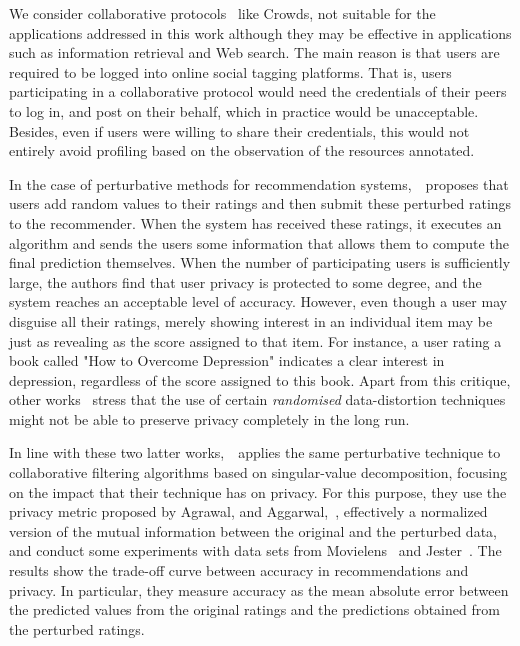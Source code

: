 We consider collaborative protocols~\cite{Domingo09DKE,Rebollo09COMCOM,Domingo12INS} like Crowds, not suitable for the applications addressed in this work although they may be effective in applications such as information retrieval and Web search. The main reason is that users are required to be logged into online social tagging platforms. That is, users participating in a collaborative protocol would need the credentials of their peers to log in, and post on their behalf, which in practice would be unacceptable. Besides, even if users were willing to share their credentials, this would not entirely avoid profiling based on the observation of the resources annotated.

In the case of perturbative methods for recommendation systems,~\cite{Polat03SDM}~proposes that users add random values to their ratings and then submit these perturbed ratings to the recommender. When the system has received these ratings, it executes an algorithm and sends the users some information that allows them to compute the final prediction themselves. When the number of participating users is sufficiently large, the authors find that user privacy is protected to some degree, and the system reaches an acceptable level of accuracy. However, even though a user may disguise all their ratings, merely showing interest in an individual item may be just as revealing as the score assigned to that item. For instance, a user rating a book called "How to Overcome Depression" indicates a clear interest in depression, regardless of the score assigned to this book. Apart from this critique, other works~\cite{Kargupta03ICDM,Huang05SIGMOD} stress that the use of certain \emph{randomised} data-distortion techniques might not be able to preserve privacy completely in the long run.

In line with these two latter works,~\cite{Polat05SAC}~applies the same perturbative technique to collaborative filtering algorithms based on singular-value decomposition, focusing on the impact that their technique has on privacy. For this purpose, they use the privacy metric proposed by Agrawal, and Aggarwal,~\cite{Agrawal01SIGMOD}, effectively a normalized version of the mutual information between the original and the perturbed data, and conduct some experiments with data sets from Movielens~\cite{Movielens} and Jester~\cite{Jester}. The results show the trade-off curve between accuracy in recommendations and privacy. In particular, they measure accuracy as the mean
absolute error between the predicted values from the original ratings and the predictions obtained from the perturbed ratings.

